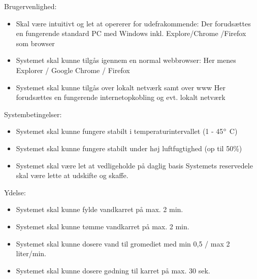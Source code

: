 Brugervenlighed:
\begin{itemize}
	\item Skal være intuitivt og let at opererer for udefrakommende:
	Der forudsættes en fungerende standard PC med Windows inkl. Explore/Chrome	/Firefox som browser

	\item Systemet skal kunne tilgås igennem en normal webbrowser:
		Her menes Explorer / Google Chrome / Firefox
	\item Systemet skal kunne tilgås over lokalt netværk samt over www
		Her forudsættes en fungerende internetopkobling og evt. lokalt netværk
\end{itemize}

Systembetingelser:
\begin{itemize}
	\item Systemet skal kunne fungere stabilt i temperaturintervallet (1 - 45$\degree$ C)
	\item Systemet skal kunne fungere stabilt under høj luftfugtighed (op til 50\%)
	\item Systemet skal være let at vedligeholde på daglig basis
		Systemets reservedele skal være lette at udskifte og skaffe.
\end{itemize}

Ydelse:
\begin{itemize}
	\item Systemet skal kunne fylde vandkarret på max. 2 min.
	\item Systemet skal kunne tømme vandkarret på max. 2 min.
	\item Systemet skal kunne dosere vand til gromediet med min 0,5 / max 2 liter/min.
	\item Systemet skal kunne dosere gødning til karret på max. 30 sek.
\end{itemize}
